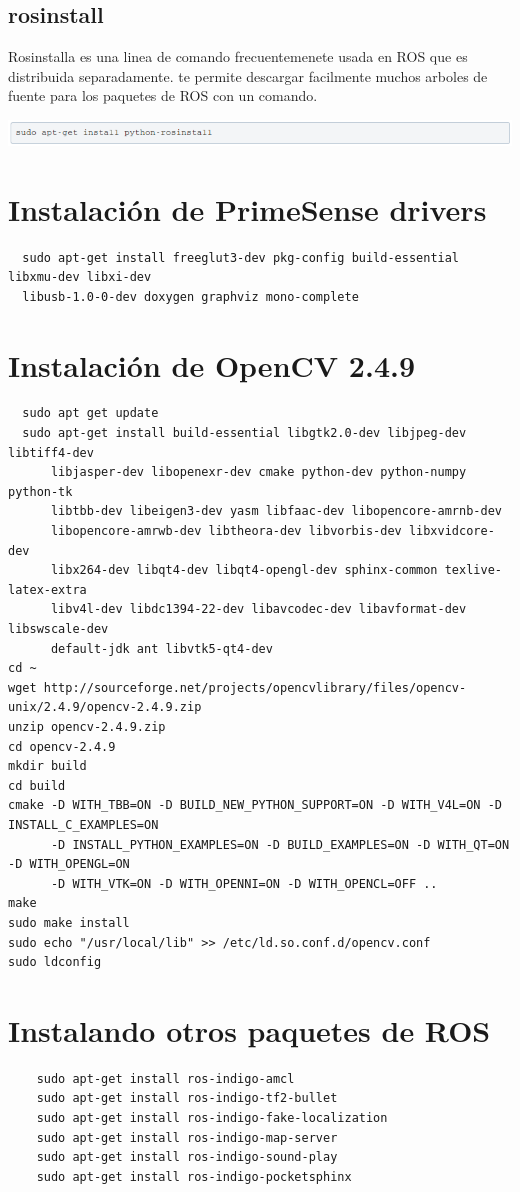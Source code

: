 \documentclass[a4paper]{book}
\begin{document}
\subsection{rosinstall}

Rosinstalla es una linea de comando frecuentemenete usada en ROS que es distribuida separadamente. te permite 
descargar facilmente muchos arboles de fuente para los paquetes de ROS con un comando.

\begin{center}
\includegraphics[width=1\textwidth]{Figures/Software/Install_ROS/Paso_17.png}
\end{center}

\section{Instalación de PrimeSense drivers}
\begin{verbatim}
  sudo apt-get install freeglut3-dev pkg-config build-essential libxmu-dev libxi-dev
  libusb-1.0-0-dev doxygen graphviz mono-complete
\end{verbatim}
\section{Instalación de OpenCV 2.4.9}
\begin{verbatim}
  sudo apt get update
  sudo apt-get install build-essential libgtk2.0-dev libjpeg-dev libtiff4-dev
      libjasper-dev libopenexr-dev cmake python-dev python-numpy python-tk
      libtbb-dev libeigen3-dev yasm libfaac-dev libopencore-amrnb-dev
      libopencore-amrwb-dev libtheora-dev libvorbis-dev libxvidcore-dev
      libx264-dev libqt4-dev libqt4-opengl-dev sphinx-common texlive-latex-extra
      libv4l-dev libdc1394-22-dev libavcodec-dev libavformat-dev libswscale-dev
      default-jdk ant libvtk5-qt4-dev
cd ~
wget http://sourceforge.net/projects/opencvlibrary/files/opencv-unix/2.4.9/opencv-2.4.9.zip
unzip opencv-2.4.9.zip
cd opencv-2.4.9
mkdir build
cd build
cmake -D WITH_TBB=ON -D BUILD_NEW_PYTHON_SUPPORT=ON -D WITH_V4L=ON -D INSTALL_C_EXAMPLES=ON
      -D INSTALL_PYTHON_EXAMPLES=ON -D BUILD_EXAMPLES=ON -D WITH_QT=ON -D WITH_OPENGL=ON
      -D WITH_VTK=ON -D WITH_OPENNI=ON -D WITH_OPENCL=OFF ..
make
sudo make install
sudo echo "/usr/local/lib" >> /etc/ld.so.conf.d/opencv.conf
sudo ldconfig
\end{verbatim}
\section{Instalando otros paquetes de ROS}
\begin{verbatim}
    sudo apt-get install ros-indigo-amcl
    sudo apt-get install ros-indigo-tf2-bullet
    sudo apt-get install ros-indigo-fake-localization
    sudo apt-get install ros-indigo-map-server
    sudo apt-get install ros-indigo-sound-play
    sudo apt-get install ros-indigo-pocketsphinx
\end{verbatim}
\end{document}

